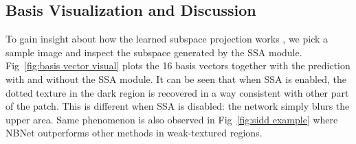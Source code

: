 \documentclass[final]{cvpr}
\begin{document}
   
\subsection{Basis Visualization and Discussion}

To gain insight about how the learned subspace projection works , we pick a sample image and inspect the subspace generated by the SSA module. Fig~\ref{fig:basis vector visual} plots the 16 basis vectors together with the prediction with and without the SSA module. 
It can be seen that when SSA is enabled, the dotted texture in the dark region is recovered in a way consistent with other part of the patch. This is different when SSA is disabled: the network simply blurs the upper area. Same phenomenon is also observed
in Fig~\ref{fig:sidd example} where NBNet outperforms other methods in weak-textured regions.
\end{document}
